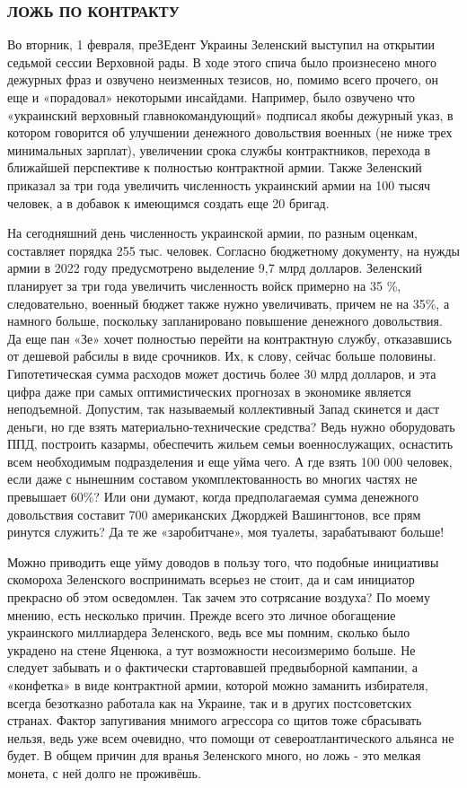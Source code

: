 \subsubsection{ЛОЖЬ ПО КОНТРАКТУ}

Во вторник, 1 февраля, преЗЕдент Украины Зеленский выступил на открытии седьмой
сессии Верховной рады. В ходе этого спича было произнесено много дежурных фраз
и озвучено неизменных тезисов, но, помимо всего прочего, он еще и «порадовал»
некоторыми инсайдами. Например, было озвучено что «украинский верховный
главнокомандующий» подписал якобы дежурный указ, в котором говорится об
улучшении денежного довольствия военных (не ниже трех минимальных зарплат),
увеличении срока службы контрактников, перехода в ближайшей перспективе к
полностью контрактной армии. Также Зеленский приказал за три года увеличить
численность украинский армии на 100 тысяч человек, а в добавок к имеющимся
создать еще 20 бригад.

На сегодняшний день численность украинской армии, по разным оценкам, составляет
порядка 255 тыс. человек. Согласно бюджетному документу, на нужды армии в 2022
году предусмотрено выделение 9,7 млрд долларов. Зеленский планирует за три года
увеличить численность войск примерно на 35 \%, следовательно, военный бюджет
также нужно увеличивать, причем не на 35\%, а намного больше, поскольку
запланировано повышение денежного довольствия. Да еще пан «Зе» хочет полностью
перейти на контрактную службу, отказавшись от дешевой рабсилы в виде срочников.
Их, к слову, сейчас больше половины. Гипотетическая сумма расходов может
достичь более 30 млрд долларов, и эта цифра даже при самых оптимистических
прогнозах в экономике является неподъемной. Допустим, так называемый
коллективный Запад скинется и даст деньги, но где взять материально-технические
средства? Ведь нужно оборудовать ППД, построить казармы, обеспечить жильем
семьи военнослужащих, оснастить всем необходимым подразделения и еще уйма чего.
А где взять 100 000 человек, если даже с нынешним составом укомплектованность
во многих частях не превышает 60\%? Или они думают, когда предполагаемая сумма
денежного довольствия составит 700 американских Джорджей Вашингтонов, все прям
ринутся служить? Да те же «заробитчане», моя туалеты, зарабатывают больше!   

Можно приводить еще уйму доводов в пользу того, что подобные инициативы
скомороха Зеленского воспринимать всерьез не стоит, да и сам инициатор
прекрасно об этом осведомлен. Так зачем это сотрясание воздуха? По моему
мнению, есть несколько причин. Прежде всего это личное обогащение украинского
миллиардера Зеленского, ведь все мы помним, сколько было украдено на стене
Яценюка, а тут возможности несоизмеримо больше. Не следует забывать и о
фактически стартовавшей предвыборной кампании, а «конфетка» в виде контрактной
армии, которой можно заманить избирателя, всегда безотказно работала как на
Украине, так и в других постсоветских странах. Фактор запугивания мнимого
агрессора со щитов тоже сбрасывать нельзя, ведь уже всем очевидно, что помощи
от североатлантического альянса не будет. В общем причин для вранья Зеленского
много, но ложь - это мелкая монета, с ней долго не проживёшь.

